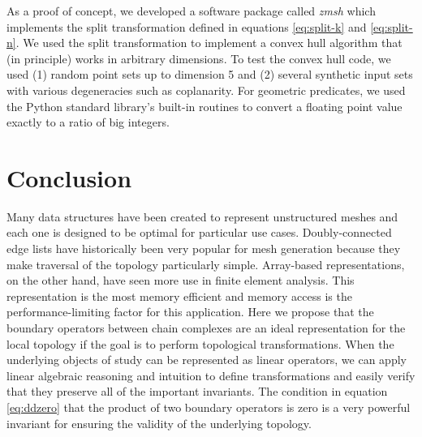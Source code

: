 \documentclass[twocolumn]{article}
\begin{document}
As a proof of concept, we developed a software package called \emph{zmsh}
which implements the split transformation defined in equations \eqref{eq:split-k} and \eqref{eq:split-n}.
We used the split transformation to implement a convex hull algorithm that (in principle) works in arbitrary dimensions.
To test the convex hull code, we used (1) random point sets up to dimension 5 and (2) several synthetic input sets with various degeneracies such as coplanarity.
For geometric predicates, we used the Python standard library's built-in routines to convert a floating point value exactly to a ratio of big integers.


\section{Conclusion}

Many data structures have been created to represent unstructured meshes and each one is designed to be optimal for particular use cases.
Doubly-connected edge lists have historically been very popular for mesh generation because they make traversal of the topology particularly simple.
Array-based representations, on the other hand, have seen more use in finite element analysis.
This representation is the most memory efficient and memory access is the performance-limiting factor for this application.
Here we propose that the boundary operators between chain complexes are an ideal representation for the local topology if the goal is to perform topological transformations.
When the underlying objects of study can be represented as linear operators, we can apply linear algebraic reasoning and intuition to define transformations and easily verify that they preserve all of the important invariants.
The condition in equation \eqref{eq:ddzero} that the product of two boundary operators is zero is a very powerful invariant for ensuring the validity of the underlying topology.



\end{document}
